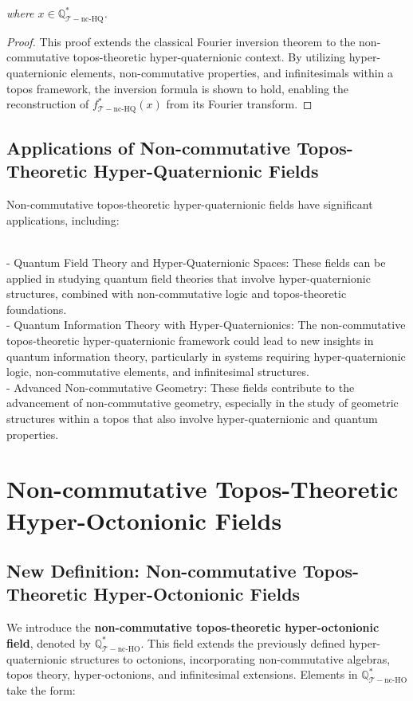 \documentclass{article}
\begin{document}
\textit{where \(x \in \mathbb{Q}_{\mathcal{T}-\text{nc-HQ}}^*\).}

\begin{proof}
This proof extends the classical Fourier inversion theorem to the non-commutative topos-theoretic hyper-quaternionic context. By utilizing hyper-quaternionic elements, non-commutative properties, and infinitesimals within a topos framework, the inversion formula is shown to hold, enabling the reconstruction of \(f_{\mathcal{T}-\text{nc-HQ}}^*(x)\) from its Fourier transform.
\end{proof}

\subsection{Applications of Non-commutative Topos-Theoretic Hyper-Quaternionic Fields}
Non-commutative topos-theoretic hyper-quaternionic fields have significant applications, including:

{\ }\\
- Quantum Field Theory and Hyper-Quaternionic Spaces: These fields can be applied in studying quantum field theories that involve hyper-quaternionic structures, combined with non-commutative logic and topos-theoretic foundations.
{\ }\\
- Quantum Information Theory with Hyper-Quaternionics: The non-commutative topos-theoretic hyper-quaternionic framework could lead to new insights in quantum information theory, particularly in systems requiring hyper-quaternionic logic, non-commutative elements, and infinitesimal structures.
{\ }\\
- Advanced Non-commutative Geometry: These fields contribute to the advancement of non-commutative geometry, especially in the study of geometric structures within a topos that also involve hyper-quaternionic and quantum properties.


\section{Non-commutative Topos-Theoretic Hyper-Octonionic Fields}
\subsection{New Definition: Non-commutative Topos-Theoretic Hyper-Octonionic Fields}
We introduce the \textbf{non-commutative topos-theoretic hyper-octonionic field}, denoted by \(\mathbb{Q}_{\mathcal{T}-\text{nc-HO}}^*\). This field extends the previously defined hyper-quaternionic structures to octonions, incorporating non-commutative algebras, topos theory, hyper-octonions, and infinitesimal extensions. Elements in \(\mathbb{Q}_{\mathcal{T}-\text{nc-HO}}^*\) take the form:
\end{document}
